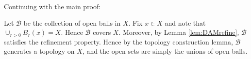 \documentclass{homework}
\begin{document}
\begin{problems}
Continuing with the main proof:

Let $\mathcal{B}$ be the collection of open balls in $X$.  Fix $x\in X$ and note
that $\cup_{r>0} B_r(x)=X$.  Hence $\mathcal{B}$ covers $X$.  Moreover, by Lemma
\ref{lem:DAMrefine}, $\mathcal{B}$ satisfies the refinement property.  Hence
by the topology construction lemma, $\mathcal{B}$ generates a topology on $X$,
and the open sets are simply the unions of open balls.

\end{problems}
\end{document}
